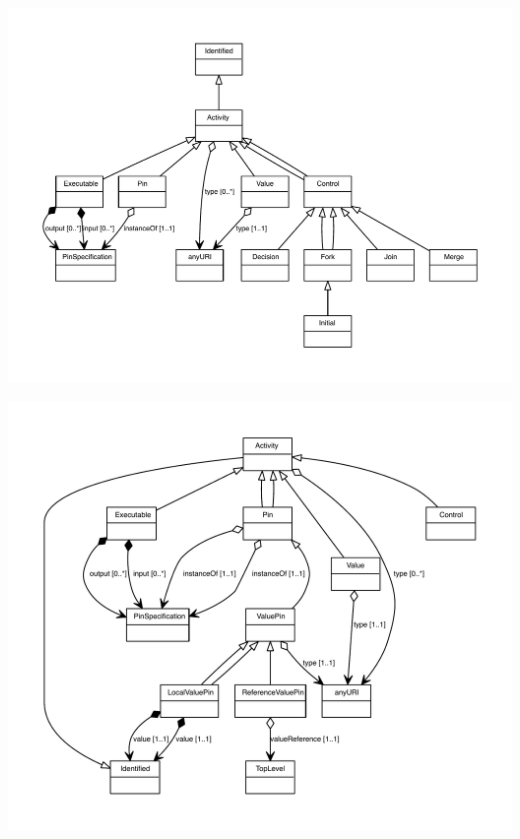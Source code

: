 \begin{center}
\includegraphics[scale=0.8]{uml/Initial_abstraction_hierarchy.pdf}
\end{center}



\begin{center}
\includegraphics[scale=0.8]{uml/LocalValuePin_abstraction_hierarchy.pdf}
\end{center}



